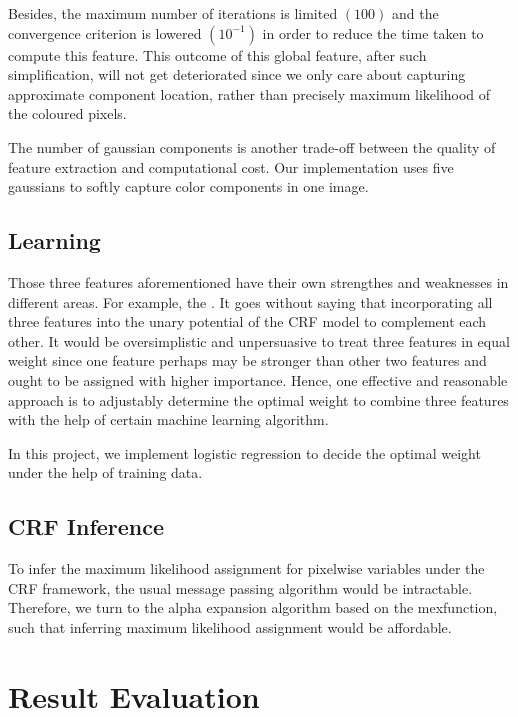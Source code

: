 \documentclass[10pt,twocolumn,letterpaper]{article}
\begin{document}
    Besides, the maximum number of iterations is limited $(100)$ and the convergence criterion is lowered $(10^{-1})$
    in order to reduce the time taken to compute this feature.  This outcome of this global feature, after such
    simplification, will not get deteriorated since we only care about capturing 
    approximate component location, rather than precisely maximum likelihood of the coloured pixels.

    The number of gaussian components is another trade-off between the quality of feature extraction
    and computational cost. Our implementation uses five gaussians to softly capture color components in one image. 

\subsection{Learning}
Those three features aforementioned have their own strengthes and weaknesses in different areas. For example, the .
It goes without saying that incorporating all three features into the unary potential of the CRF model 
to complement each other. It would be oversimplistic and unpersuasive to treat three features in equal weight 
since one feature perhaps may be stronger than other two features and ought to be assigned with higher importance.
Hence, one effective and reasonable approach is to adjustably determine the optimal weight to combine three features
with the help of certain machine learning algorithm. 

In this project, we implement logistic regression to decide the optimal weight under the help of training data.

\subsection{CRF Inference}
To infer the maximum likelihood assignment for pixelwise variables under the CRF framework,
the usual message passing algorithm would be intractable. Therefore, we turn to the alpha expansion algorithm 
based on the mexfunction, such that inferring maximum likelihood assignment would be affordable. 

\section{Result Evaluation}
\end{document}
